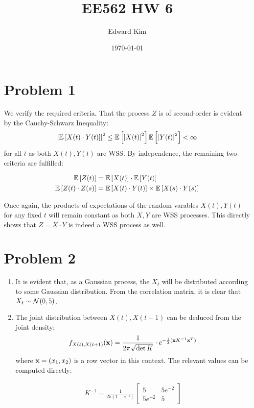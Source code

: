 \documentclass[12pt]{article}%
\title{EE562 HW 6}
\author{Edward Kim}
\date{\today}
\begin{document}
\maketitle

\section{Problem 1}

We verify the required criteria. That the process $Z$ is of second-order is evident by the Cauchy-Schwarz Inequality:
%
\[\abs{\mathbb{E}\left[X(t)\cdot Y(t)\right]}^2 \leq \mathbb{E}\left[\abs
{X(t)}^2\right] \mathbb{E}\left[\abs{Y(t)}^2\right] < \infty \]
for all $t$ as both $X(t),Y(t)$ are WSS. By independence, the remaining two criteria are fulfilled:

\begin{align*}
  \mathbb{E}\left[Z(t)\right] & = \mathbb{E}\left[X(t)\right]\cdot\mathbb{E}\left[Y(t)\right] \\
  \mathbb{E}\left[Z(t)\cdot Z(s)\right] & = \mathbb{E}\left[X(t)\cdot Y(t)\right]\times \mathbb{E}\left[X(s)\cdot Y(s)\right]
\end{align*}

Once again, the products of expectations of the random varables $X(t),Y(t)$ for any fixed $t$ will remain constant as both $X,Y$ are WSS processes. This directly shows that $Z = X \cdot Y$ is indeed a WSS process as well.

\section{Problem 2}
\begin{enumerate}
  \item It is evident that, as a Gaussian process, the $X_t$ will be distributed according to some Gaussian distribution. From the correlation matrix, it is clear that $X_t \sim \mathcal{N}(0,5)$.

  \item
  The joint distribution between $X(t),X(t+1)$ can be deduced from the joint density:
%
  \begin{align*}
    f_{X(t),X(t+1)}({\bold x}) = \frac{1}{2\pi \sqrt{\det K}} \cdot e^{-\frac{1}{2}({\bold x} K^{-1} {\bold x}^T)}
  \end{align*}
  where ${\bold x} = (x_1,x_2)$ is a row vector in this context. The relevant values can be computed directly:

  \begin{align*}
    K^{-1} = \frac{1}{25(1 - e^{-4})}\begin{bmatrix}
        5 & 5e^{-2} \\  5e^{-2} & 5
  \end{bmatrix}
  \end{align*}
\end{enumerate}
\end{document}
